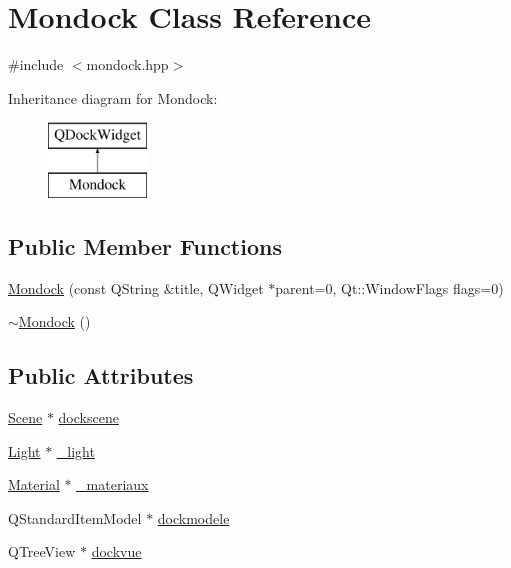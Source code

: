 \hypertarget{class_mondock}{\section{Mondock Class Reference}
\label{class_mondock}
}


{\ttfamily \#include $<$mondock.\+hpp$>$}

Inheritance diagram for Mondock\+:\begin{figure}[H]
\begin{center}
\leavevmode
\includegraphics[height=2.000000cm]{class_mondock}
\end{center}
\end{figure}
\subsection*{Public Member Functions}
\begin{DoxyCompactItemize}
\item 
\hyperlink{class_mondock_a31297333af7c87f4f9773728db845d7f}{Mondock} (const Q\+String \&title, Q\+Widget $\ast$parent=0, Qt\+::\+Window\+Flags flags=0)
\item 
\hyperlink{class_mondock_a33aa83a1e0de9cf10380c1a5237eec7e}{$\sim$\+Mondock} ()
\end{DoxyCompactItemize}
\subsection*{Public Attributes}
\begin{DoxyCompactItemize}
\item 
\hyperlink{class_scene}{Scene} $\ast$ \hyperlink{class_mondock_ac6fd15f2143e05b554f3f936e6f1588f}{dockscene}
\item 
\hyperlink{class_light}{Light} $\ast$ \hyperlink{class_mondock_a541a241aadaf9820926b427f2d504573}{\+\_\+light}
\item 
\hyperlink{class_material}{Material} $\ast$ \hyperlink{class_mondock_ada15f5ec6dabb8728651472f5cc867a8}{\+\_\+materiaux}
\item 
Q\+Standard\+Item\+Model $\ast$ \hyperlink{class_mondock_a3f46e1710907a9aedf250fce4ba93076}{dockmodele}
\item 
Q\+Tree\+View $\ast$ \hyperlink{class_mondock_a32e24e3ef7312fbd292740e19c3d3dcd}{dockvue}
\end{DoxyCompactItemize}
